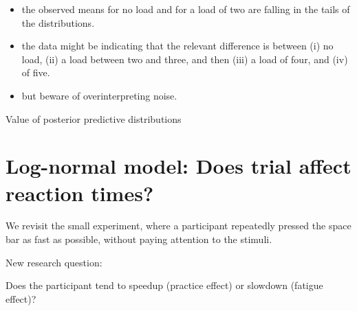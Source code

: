 \documentclass[12pt,ignorenonframetext,aspectratio=169]{beamer}
\providecommand{\tightlist}{%
  \setlength{\itemsep}{0pt}\setlength{\parskip}{0pt}}
\begin{document}
\begin{frame}

\begin{itemize}
\tightlist
\item
  the observed means for no load and for a load of two are falling in the tails of the distributions.
\item
  the data might be indicating that the relevant difference is between (i) no load, (ii) a load between two and three, and then (iii) a load of four, and (iv) of five.
\item
  but beware of overinterpreting noise.
\end{itemize}

\end{frame}

\begin{frame}{Value of posterior predictive distributions}
\protect\hypertarget{value-of-posterior-predictive-distributions}{}


\end{frame}

\hypertarget{sec:trial}{%
\section{Log-normal model: Does trial affect reaction times?}\label{sec:trial}}

\begin{frame}

We revisit the small experiment, where a participant repeatedly pressed the space bar as fast as possible, without paying attention to the stimuli.

\begin{block}{New research question:}

Does the participant tend to speedup (practice effect) or slowdown (fatigue effect)?

\end{block}

\end{frame}
\end{document}
